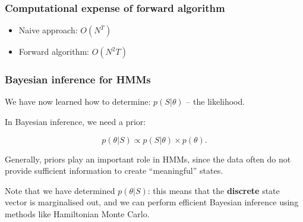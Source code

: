 \documentclass[main.tex]{subfiles}
\begin{document}
\begin{frame}
\frametitle{Computational expense of forward algorithm}

\begin{itemize}
    \item Naive approach: $O(N^T)$
    \item Forward algorithm: $O(N^2 T)$
\end{itemize}
    
\end{frame}

\begin{frame}
\frametitle{Bayesian inference for HMMs}

We have now learned how to determine: $p(S|\theta)$ -- the likelihood. 

\vspace{0.5cm}

In Bayesian inference, we need a prior:

\vspace{0.5cm}

\begin{equation}
    p(\theta | S) \propto p(S|\theta) \times p(\theta).
\end{equation}

\vspace{0.5cm}

Generally, priors play an important role in HMMs, since the data often do not provide sufficient information to create ``meaningful'' states.

\vspace{0.5cm}

Note that we have determined $p(\theta | S)$: this means that the \textbf{discrete} state vector is marginalised out, and we can perform efficient Bayesian inference using methods like Hamiltonian Monte Carlo.
    
\end{frame}
\end{document}
